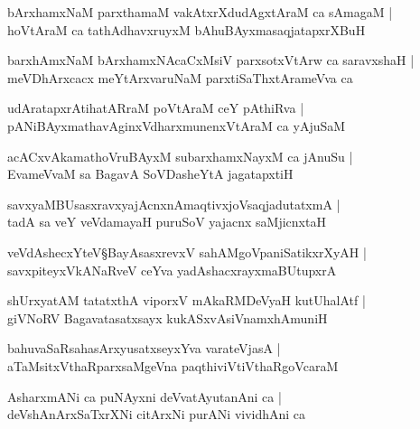 \begin{shloka}
bArxhamxNaM parxthamaM vakAtxrXdudAgxtAraM ca sAmagaM |\\
hoVtAraM ca tathAdhavxruyxM bAhuBAyxmasaqjatapxrXBuH 
\end{shloka}

\begin{shloka}
barxhAmxNaM bArxhamxNAcaCxMsiV parxsotxVtArw ca saravxshaH |\\
meVDhArxcacx meYtArxvaruNaM parxtiSaThxtArameVva ca 
\end{shloka}

\begin{shloka}
udAratapxrAtihatARraM poVtAraM ceY pAthiRva |\\
pANiBAyxmathavAginxVdharxmunenxVtAraM ca yAjuSaM
\end{shloka}

\begin{shloka}
acACxvAkamathoVruBAyxM subarxhamxNayxM ca jAnuSu |\\
EvameVvaM sa BagavA\R{} SoVDasheYtA\R{} jagatapxtiH 
\end{shloka}

\begin{shloka}
savxyaMBUsasxravxyajAcnxnAmaqtivxjoVsaqjadutatxmA\R{} |\\
tadA sa veY veVdamayaH puruSoV yajacnx saMjicnxtaH 
\end{shloka}

\begin{shloka}
veVdAshecxYteV\S BayAsasxrevxV sahAMgoVpaniSatikxrXyAH |\\
savxpiteyxVkANaRveV ceYva yadAshacxrayxmaBUtupxrA 
\end{shloka}

\begin{shloka}
shUrxyatAM tatatxthA viporxV mAkaRMDeVyaH kutUhalAtf |\\
giVNoRV Bagavatasatxsayx kukASxvAsiVnamxhAmuniH
\end{shloka}

\begin{shloka}
bahuvaSaRsahasArxyusatxseyxYva varateVjasA |\\
aTaMsitxVthaRparxsaMgeVna paqthiviVtiVthaRgoVcaraM 
\end{shloka}

\begin{shloka}
AsharxmANi ca puNAyxni deVvatAyutanAni ca |\\
deVshAnArxSaTxrXNi citArxNi purANi vividhAni ca 
\end{shloka}

